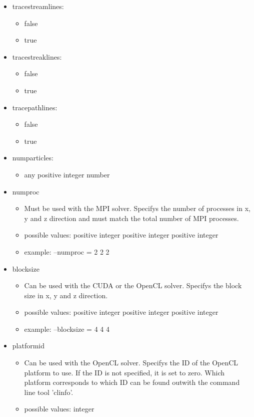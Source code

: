 \documentclass{article}%
\begin{document}
\begin{itemize}
\item tracestreamlines:
	\begin{itemize}
	\item false
	\item true
	\end{itemize}
\item tracestreaklines:
	\begin{itemize}
	\item false
	\item true
	\end{itemize}
\item tracepathlines:
	\begin{itemize}
	\item false
	\item true
	\end{itemize}
\item numparticles:
	\begin{itemize}
	\item any positive integer number
	\end{itemize}
\item numproc
	\begin{itemize}
	\item Must be used with the MPI solver. Specifys the number of processes in x, y and z direction and must match the total number of MPI processes.
	\item possible values: positive integer positive integer positive integer
	\item example: --numproc = 2 2 2
	\end{itemize}
\item blocksize
	\begin{itemize}
	\item Can be used with the CUDA or the OpenCL solver. Specifys the block size in x, y and z direction.
	\item possible values: positive integer positive integer positive integer
	\item example: --blocksize = 4 4 4
	\end{itemize}
\item platformid
	\begin{itemize}
	\item Can be used with the OpenCL solver. Specifys the ID of the OpenCL platform to use. If the ID is not specified, it is set to zero. Which platform corresponds to which ID can be found outwith the command line tool 'clinfo'.
	\item possible values: integer
	\end{itemize}
\end{itemize}
\end{document}
